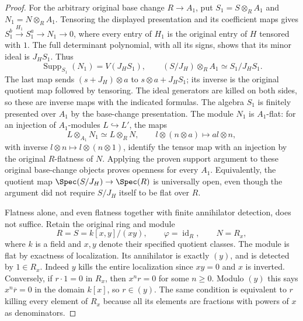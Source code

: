 \begin{proof}
For the arbitrary original base change $R\to A_1$,
put $S_1=S\otimes_RA_1$ and $N_1=N\otimes_RA_1$.
Tensoring the displayed presentation and its
coefficient maps gives
$S_1^b\xrightarrow{H_1}S_1^a\to N_1\to0$,
where every entry of $H_1$ is the original entry
of $H$ tensored with $1$. The full determinant
polynomial, with all its signs, shows that its
minor ideal is $J_HS_1$. Thus
$$
\operatorname{Supp}_{S_1}(N_1)=V(J_HS_1),
\qquad
(S/J_H)\otimes_RA_1\simeq S_1/J_HS_1.
$$
The last map sends $(s+J_H)\otimes a$ to
$s\otimes a+J_HS_1$; its inverse is the
original quotient map followed by tensoring.
The ideal generators are killed on both sides,
so these are inverse maps with the indicated
formulas. The algebra $S_1$ is finitely presented
over $A_1$ by the base-change presentation.
The module $N_1$ is $A_1$-flat: for an injection
of $A_1$-modules $L\hookrightarrow L'$, the maps
$$
L\otimes_{A_1}N_1\simeq L\otimes_RN,
\qquad l\otimes(n\otimes a)\longmapsto al\otimes n,
$$
with inverse $l\otimes n\mapsto l\otimes(n\otimes1)$,
identify the tensor map with an injection by
the original $R$-flatness of $N$.
Applying the proven support argument to these
original base-change objects proves openness
for every $A_1$. Equivalently, the quotient map
$\Spec(S/J_H)\to\Spec(R)$ is universally open,
even though the argument did not require
$S/J_H$ itself to be flat over $R$.

Flatness alone, and even flatness together with
finite annihilator detection, does not suffice.
Retain the original ring and module
$$
R=S=k[x,y]/(xy),\qquad \varphi=\operatorname{id}_R,
\qquad N=R_x,
$$
where $k$ is a field and $x,y$ denote their
specified quotient classes. The module is flat
by exactness of localization. Its annihilator
is exactly $(y)$, and is detected by $1\in R_x$.
Indeed $y$ kills the entire localization since
$xy=0$ and $x$ is inverted. Conversely, if
$r\cdot1=0$ in $R_x$, then $x^nr=0$ for some
$n\geq0$. Modulo $(y)$ this says
$x^n\overline r=0$ in the domain $k[x]$,
so $r\in(y)$. The same condition is equivalent
to $r$ killing every element of $R_x$ because
all its elements are fractions with powers
of $x$ as denominators.


\end{proof}

